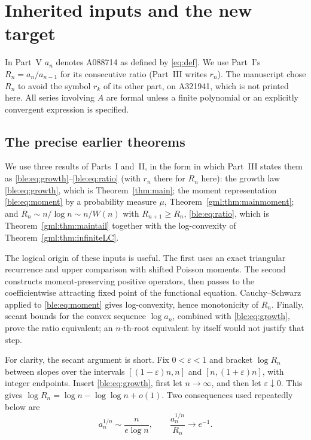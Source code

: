\documentclass[11pt]{article}
\numberwithin{equation}{section}
\theoremstyle{definition}
\theoremstyle{remark}
\begin{document}
\section{Inherited inputs and the new target}\label{bnc:sec:bell-inputs}

In Part~V \(a_n\) denotes A088714 as defined by \eqref{eq:def}.
We use Part~I's \(R_n=a_n/a_{n-1}\) for its consecutive ratio (Part~III
writes \(r_n\)). The manuscript chose \(R_n\) to avoid the symbol \(r_k\)
of its other part, on A321941, which is not printed here.
All series involving \(A\) are formal unless a finite polynomial
or an explicitly convergent expression is specified.

\subsection{The precise earlier theorems}

We use three results of Parts~I and~II, in the form in which Part~III
states them as \eqref{ble:eq:growth}--\eqref{ble:eq:ratio} (with \(r_n\)
there for \(R_n\) here): the growth law \eqref{ble:eq:growth}, which is
Theorem~\ref{thm:main}; the moment representation \eqref{ble:eq:moment}
by a probability measure \(\mu\), Theorem~\ref{gml:thm:mainmoment}; and
\(R_n\sim n/\log n\sim n/W(n)\) with \(R_{n+1}\ge R_n\),
\eqref{ble:eq:ratio}, which is Theorem~\ref{gml:thm:maintail} together
with the log-convexity of Theorem~\ref{gml:thm:infiniteLC}.

The logical origin of these inputs is useful.  The first uses an
exact triangular recurrence and upper comparison with shifted
Poisson moments.  The second constructs moment-preserving positive
operators, then passes to the coefficientwise attracting fixed
point of the functional equation.  Cauchy--Schwarz applied to
\eqref{ble:eq:moment} gives log-convexity, hence monotonicity
of \(R_n\).  Finally, secant bounds for the convex sequence
\(\log a_n\), combined with \eqref{ble:eq:growth}, prove the
ratio equivalent; an \(n\)-th-root equivalent by itself would
not justify that step.

For clarity, the secant argument is short.  Fix \(0<\varepsilon<1\)
and bracket \(\log R_n\) between slopes over the intervals
\([(1-\varepsilon)n,n]\) and \([n,(1+\varepsilon)n]\), with
integer endpoints.  Insert \eqref{ble:eq:growth}, first let
\(n\to\infty\), and then let \(\varepsilon\downarrow0\).
This gives
\(\log R_n=\log n-\log\log n+o(1)\).
Two consequences used repeatedly below are
\[
 a_n^{1/n}\sim\frac n{e\log n},\qquad
 \frac{a_n^{1/n}}{R_n}\longrightarrow e^{-1}.
\]
\end{document}
